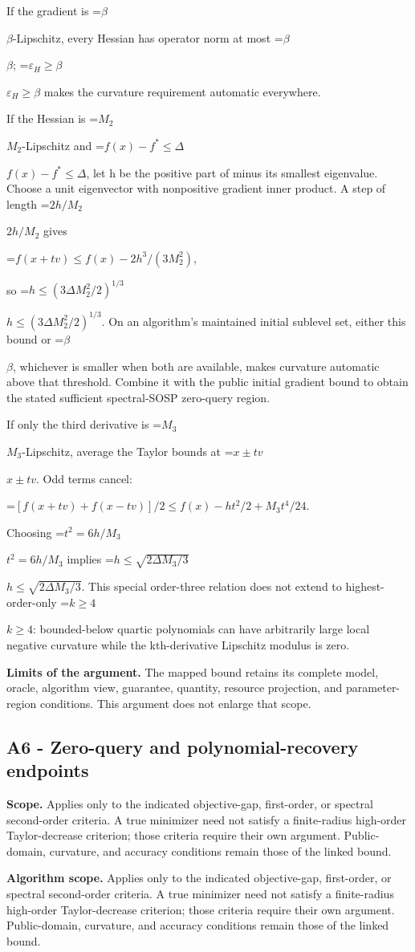 \documentclass[10pt,a4paper]{article}
\newcommand{\AtlasMath}[1]{\par\begingroup\centering\setbox0=\hbox{$\displaystyle #1$}\ifdim\wd0>1.4\linewidth\typeout{ATLAS WIDE FORMULA: \the\wd0}\fi\ifdim\wd0>\linewidth\resizebox{\linewidth}{!}{\box0}\else\box0\fi\par\endgroup}
\newcommand{\AtlasInlineMath}[1]{\begingroup\setbox0=\hbox{$#1$}\ifdim\wd0>.4\linewidth\endgroup\AtlasMath{#1}\else\endgroup$#1$\fi}
\begin{document}
If the gradient is \AtlasInlineMath{\beta}-Lipschitz, every Hessian has operator norm at most \AtlasInlineMath{\beta}; \AtlasInlineMath{\varepsilon_H\ge\beta} makes the curvature requirement automatic everywhere.

If the Hessian is \AtlasInlineMath{M_2}-Lipschitz and \AtlasInlineMath{f(x)-f^*\le\Delta}, let h be the positive part of minus its smallest eigenvalue. Choose a unit eigenvector with nonpositive gradient inner product. A step of length \AtlasInlineMath{2h/M_2} gives

\AtlasMath{f(x+tv)\le f(x)-2h^3/(3M_2^2),}

so \AtlasInlineMath{h\le(3\Delta M_2^2/2)^{1/3}}. On an algorithm's maintained initial sublevel set, either this bound or \AtlasInlineMath{\beta}, whichever is smaller when both are available, makes curvature automatic above that threshold. Combine it with the public initial gradient bound to obtain the stated sufficient spectral-SOSP zero-query region.

If only the third derivative is \AtlasInlineMath{M_3}-Lipschitz, average the Taylor bounds at \AtlasInlineMath{x\pm tv}. Odd terms cancel:

\AtlasMath{[f(x+tv)+f(x-tv)]/2\le f(x)-ht^2/2+M_3t^4/24.}

Choosing \AtlasInlineMath{t^2=6h/M_3} implies \AtlasInlineMath{h\le\sqrt{2\Delta M_3/3}}. This special order-three relation does not extend to highest-order-only \AtlasInlineMath{k\ge4}: bounded-below quartic polynomials can have arbitrarily large local negative curvature while the kth-derivative Lipschitz modulus is zero.

\textbf{Limits of the argument.} The mapped bound retains its complete model, oracle, algorithm view, guarantee, quantity, resource projection, and parameter-region conditions. This argument does not enlarge that scope.

\subsection{A6 - Zero-query and polynomial-recovery endpoints}
\textbf{Scope.} Applies only to the indicated objective-gap, first-order, or spectral second-order criteria. A true minimizer need not satisfy a finite-radius high-order Taylor-decrease criterion; those criteria require their own argument. Public-domain, curvature, and accuracy conditions remain those of the linked bound.

\textbf{Algorithm scope.} Applies only to the indicated objective-gap, first-order, or spectral second-order criteria. A true minimizer need not satisfy a finite-radius high-order Taylor-decrease criterion; those criteria require their own argument. Public-domain, curvature, and accuracy conditions remain those of the linked bound.
\end{document}
